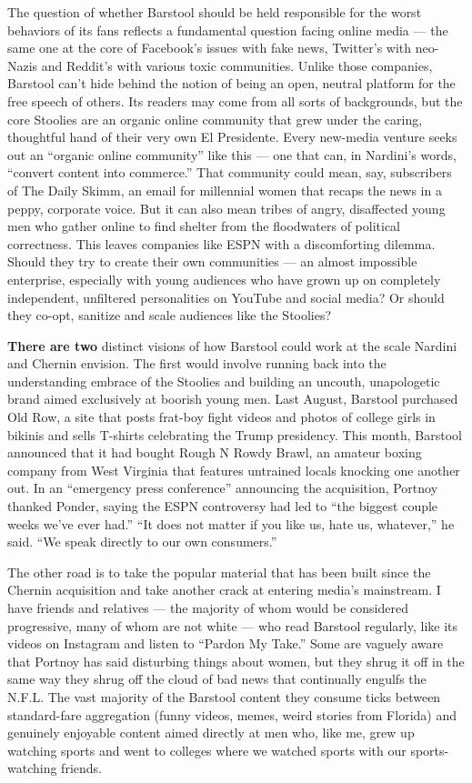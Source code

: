 The question of whether Barstool should be held responsible for the
worst behaviors of its fans reflects a fundamental question facing
online media --- the same one at the core of Facebook's issues with fake
news, Twitter's with neo-Nazis and Reddit's with various toxic
communities. Unlike those companies, Barstool can't hide behind the
notion of being an open, neutral platform for the free speech of others.
Its readers may come from all sorts of backgrounds, but the core
Stoolies are an organic online community that grew under the caring,
thoughtful hand of their very own El Presidente. Every new-media venture
seeks out an ``organic online community'' like this --- one that can, in
Nardini's words, ``convert content into commerce.'' That community could
mean, say, subscribers of The Daily Skimm, an email for millennial women
that recaps the news in a peppy, corporate voice. But it can also mean
tribes of angry, disaffected young men who gather online to find shelter
from the floodwaters of political correctness. This leaves companies
like ESPN with a discomforting dilemma. Should they try to create their
own communities --- an almost impossible enterprise, especially with
young audiences who have grown up on completely independent, unfiltered
personalities on YouTube and social media? Or should they co-opt,
sanitize and scale audiences like the Stoolies?

\textbf{There are two} distinct visions of how Barstool could work at
the scale Nardini and Chernin envision. The first would involve running
back into the understanding embrace of the Stoolies and building an
uncouth, unapologetic brand aimed exclusively at boorish young men. Last
August, Barstool purchased Old Row, a site that posts frat-boy fight
videos and photos of college girls in bikinis and sells T-shirts
celebrating the Trump presidency. This month, Barstool announced that it
had bought Rough N Rowdy Brawl, an amateur boxing company from West
Virginia that features untrained locals knocking one another out. In an
``emergency press conference'' announcing the acquisition, Portnoy
thanked Ponder, saying the ESPN controversy had led to ``the biggest
couple weeks we've ever had.'' ``It does not matter if you like us, hate
us, whatever,'' he said. ``We speak directly to our own consumers.''

The other road is to take the popular material that has been built since
the Chernin acquisition and take another crack at entering media's
mainstream. I have friends and relatives --- the majority of whom would
be considered progressive, many of whom are not white --- who read
Barstool regularly, like its videos on Instagram and listen to ``Pardon
My Take.'' Some are vaguely aware that Portnoy has said disturbing
things about women, but they shrug it off in the same way they shrug off
the cloud of bad news that continually engulfs the N.F.L. The vast
majority of the Barstool content they consume ticks between
standard-fare aggregation (funny videos, memes, weird stories from
Florida) and genuinely enjoyable content aimed directly at men who, like
me, grew up watching sports and went to colleges where we watched sports
with our sports-watching friends.

